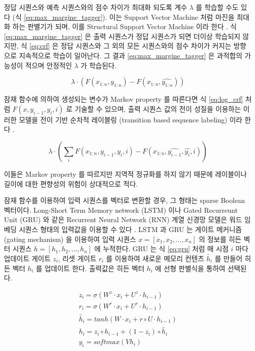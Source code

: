 \documentclass[oneside, ko,phd]{snuthesis_utf8_kor}
\begin{document}
정답 시퀀스와 예측 시퀀스와의 점수 차이가 최대화 되도록 계수 $\lambda$ 를 학습할 수도 있다 (식 \ref{eq:max_margine_tagger}).
이는 Support Vector Machine 처럼 마진을 최대화 하는 판별기가 되며, 이를 Structural Support Vector Machine 이라 한다 \cite{taskar2004max, tsochantaridis2005large}.
식 \ref{eq:max_margine_tagger} 은 출력 시퀀스가 정답 시퀀스가 되면 더이상 학습되지 않지만, 식 \ref{eq:crf} 은 정답 시퀀스와 그 외의 모든 시퀀스와의 점수 차이가 커지는 방향으로 지속적으로 학습이 일어난다.
그 결과 \ref{eq:max_margine_tagger} 은 과적합의 가능성이 적으며 안정적인 $\lambda$ 가 학습된다.

\begin{equation}
  \label{eq:max_margine_tagger}
  \lambda \cdot \left( F(x_{1:n}, y_{1:n}) - F(x_{1:n}, \hat{y_{1:n}}) \right)
\end{equation}

잠재 함수에 의하여 생성되는 변수가 Markov property 를 따른다면 식 \ref{eq:log_crf} 처럼 $F(x, y_{i-1}, y_{i}, i)$ 로 기술할 수 있으며, 출력 시퀀스 값의 전이 성질을 이용하는 이러한 모델을 전이 기반 순차적 레이블링 (transition based sequence labeling) 이라 한다 \cite{bohnet2012transition}.

\begin{equation}
  \label{eq:transition_based_tagger_i}
  \lambda \cdot \left( \sum_i F(x_{1:n}, y_{i-1}, y_i, i) - F(x_{1:n}, \hat{y_{i-1}}, \hat{y_i}, i) \right)
\end{equation}

이들은 Markov property 를 따르지만 지역적 정규화를 하지 않기 때문에 레이블이나 길이에 대한 편향성의 위험이 상대적으로 적다.

잠재 함수를 이용하여 입력 시퀀스를 벡터로 변환할 경우, 그 형태는 sparse Boolean 벡터이다.
Long-Short Term Memory network (LSTM) 이나 Gated Recurreunt Unit (GRU) 와 같은 Recurrent Neural Network (RNN) 계열 신경망 모델은 워드 임베딩 시퀀스 형태의 입력값을 이용할 수 있다 \cite{cho2014learning, hochreiter1997long}.
LSTM 과 GRU 는 게이트 메커니즘 (gating mechanism) 을 이용하여 입력 시퀀스 $x = [x_1, x_2, \dots, x_n]$ 의 정보를 히든 벡터 시퀀스 $h = [h_1, h_2, \dots, h_n]$ 에 누적한다.
GRU 는 식 \ref{eq:gru} 처럼 매 시점 $i$ 마다 업데이트 게이트 $z_i$, 리셋 게이트 $r_i$ 를 이용하여 새로운 메모리 컨텐츠 $\tilde{h_i}$ 를 만들어 히든 벡터 $h_i$ 를 업데이트 한다.
출력값은 히든 벡터 $h_i$ 에 선형 판별식을 통하여 선택된다.

\begin{equation}
  \label{eq:gru}
  \begin{aligned}
  z_i = \sigma(W^z \cdot x_i + U^z \cdot h_{i-1}) \\
  r_i = \sigma(W^r \cdot x_i + U^r \cdot h_{i-1}) \\
  \tilde{h_i} = tanh \left( W \cdot x_i + r \circ U \cdot h_{i-1}\right) \\
  h_i = z_i \circ h_{i-1} + (1 - z_i) \circ \tilde{h_i} \\
  y_i = softmax(Vh_i)
  \end{aligned}
\end{equation}
\end{document}
